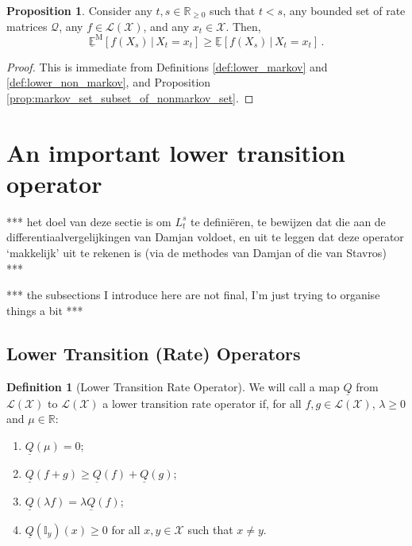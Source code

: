 \documentclass[10pt]{paper}
\theoremstyle{definition}
\newtheorem{proposition}[theorem]{Proposition}
\newtheorem{definition}{Definition}
\newcommand{\reals}{\mathbb{R}}
\newcommand{\realsnonneg}{\reals_{\geq 0}}
\newcommand{\states}{\mathcal{X}}
\newcommand{\lbound}{L}
\newcommand{\gambles}{\mathcal{L}}
\newcommand{\gamblesX}{\gambles(\states)}
\newcommand{\ind}[1]{\mathbb{I}_{#1}}
\newcommand{\rateset}{\mathcal{Q}}
\newcommand{\lrate}{\underline{Q}}
\begin{document}
\begin{proposition}\label{prop:lower_exp_markov_bounded_by_nonmarkov}
Consider any $t,s\in\realsnonneg$ such that $t<s$, any bounded set of rate matrices $\rateset$, any $f\in\gamblesX$, and any $x_t\in\states$. Then,
\begin{equation*}
\underline{\mathbb{E}}^\mathrm{M}[f(X_s)\,\vert\,X_t=x_t] \geq \underline{\mathbb{E}}[f(X_s)\,\vert\,X_t=x_t]\,.
\end{equation*}
\end{proposition}
\begin{proof}
This is immediate from Definitions \ref{def:lower_markov} and \ref{def:lower_non_markov}, and Proposition \ref{prop:markov_set_subset_of_nonmarkov_set}.
\end{proof}

\section{An important lower transition operator}
\label{sec:lowertrans}




*** het doel van deze sectie is om $\lbound_t^s$ te defini\"eren, te bewijzen dat die aan de differentiaalvergelijkingen van Damjan voldoet, en uit te leggen dat deze operator `makkelijk' uit te rekenen is (via de methodes van Damjan of die van Stavros) ***

*** the subsections I introduce here are not final, I'm just trying to organise things a bit ***


\subsection{Lower Transition (Rate) Operators}

\begin{definition}[Lower Transition Rate Operator]\label{def:coh_low_trans_rate}
We will call a map $\lrate$ from $\gamblesX$ to $\gamblesX$ a lower transition rate operator if, for all $f,g\in\gamblesX$, $\lambda\geq0$ and $\mu\in\reals$:

\vspace{5pt}
\begin{enumerate}[label=LR\arabic*:,ref=LR\arabic*]
\item\label{LR:constantzero}
$\lrate(\mu)=0$;
\item\label{LR:subadditive}
$\lrate(f+g)\geq\lrate(f)+\lrate(g)$;
\item\label{LR:homo}
$\lrate(\lambda f)=\lambda\lrate(f)$;
\item\label{LR:nondiagpos}
$\lrate(\ind{y})(x)\geq0$ for all $x,y\in\states$ such that $x\neq y$.
\end{enumerate}
\vspace{5pt}
\end{definition}
\end{document}
